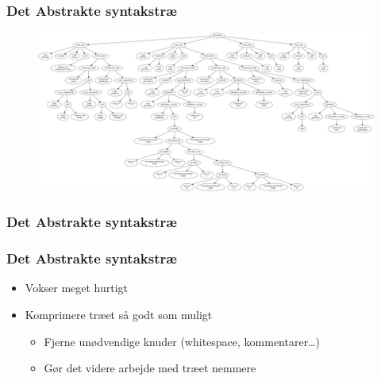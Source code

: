 \begin{frame}
  \frametitle{Det Abstrakte syntakstræ}

  \begin{figure}
    \includegraphics[width=0.8\linewidth]{billeder/ast}
  \end{figure}
\end{frame}

\begin{frame}
  \frametitle{Det Abstrakte syntakstræ}
 
  
  
  
\end{frame}

\begin{frame}
  \frametitle{Det Abstrakte syntakstræ}

  \begin{itemize}
    \item Vokser meget hurtigt
    \item Komprimere træet så godt som muligt
      \begin{itemize}
        \item Fjerne unødvendige knuder (whitespace, kommentarer\ldots)
        \item Gør det videre arbejde med træet nemmere
      \end{itemize}
  \end{itemize}
\end{frame}

